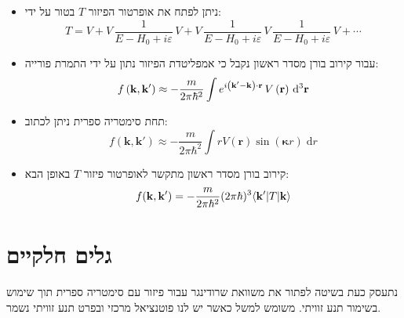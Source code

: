 \documentclass{tstextbook}
\begin{document}
\begin{summary}
  \begin{itemize}
    \item ניתן לפתח את אופרטור הפיזור \(T\) בטור על ידי:
$$T=V+V\,\frac{1}{E-H_{0}+i\varepsilon}\,V+V\,\frac{1}{E-H_{0}+i\varepsilon}\,V\,\frac{1}{E-H_{0}+i\varepsilon}\,V+\cdots$$
    \item עבור קירוב בורן מסדר ראשון נקבל כי אמפליטדת הפיזור נתון על ידי התמרת פורייה:
$$f\left( {\bf k},{\bf k^{\prime}} \right)\approx-\frac{m}{2\pi\hbar^{2}}\int e^{i\left( {\bf k^{\prime}}-{\bf k} \right)\cdot{\bf r}}\,V\left( {\bf r} \right)\,\mathrm{d}^{3}{\bf r}$$
    \item תחת סימטריה ספרית ניתן לכתוב:
$$f \left( \mathbf{k,k'} \right)\approx -\frac{m}{2\pi \hbar^{2}}\int r V\left( \mathbf{r} \right)\sin\left( \boldsymbol\kappa r \right)\;\mathrm{d} r $$
    \item קירוב בורן מסדר ראשון מתקשר לאופרטור פיזור \(T\) באופן הבא:
$$f({\bf k},{\bf k^{\prime}})=-\frac{m}{2\pi\hbar^{2}}(2\pi\hbar)^{3}\langle{\bf k^{\prime}}|T|{\bf k}\rangle$$
  \end{itemize}
\end{summary}
\section{גלים חלקיים}

נתעסק כעת בשיטה לפתור את משוואת שרודינגר עבור פיזור עם סימטריה ספרית תוך שימוש בשימור תנע זוויתי. משומש למשל כאשר יש לנו פוטנציאל מרכזי ובפרט תנע זוויתי נשמר. 
\end{document}
